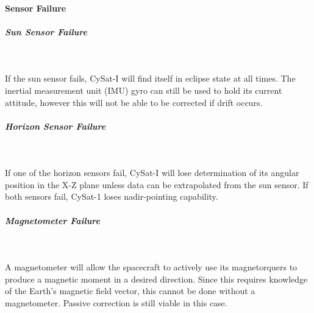 \documentclass[12pt]{article}
\begin{document}
\paragraph{Sensor Failure} 

\subparagraph{Sun Sensor Failure} \

If the sun sensor fails, CySat-I will find itself in eclipse state at all times. The inertial measurement unit (IMU) gyro can still be used to hold its current attitude, however this will not be able to be corrected if drift occurs. 

\subparagraph{Horizon Sensor Failure} \

If one of the horizon sensors fail, CySat-I will lose determination of its angular position in the X-Z plane unless data can be extrapolated from the sun sensor. If both sensors fail, CySat-1 loses nadir-pointing capability.

\subparagraph{Magnetometer Failure} \

A magnetometer will allow the spacecraft to actively use its magnetorquers to produce a magnetic moment in a desired direction. Since this requires knowledge of the Earth’s magnetic field vector, this cannot be done without a magnetometer. Passive correction is still viable in this case.

\newpage
\end{document}
